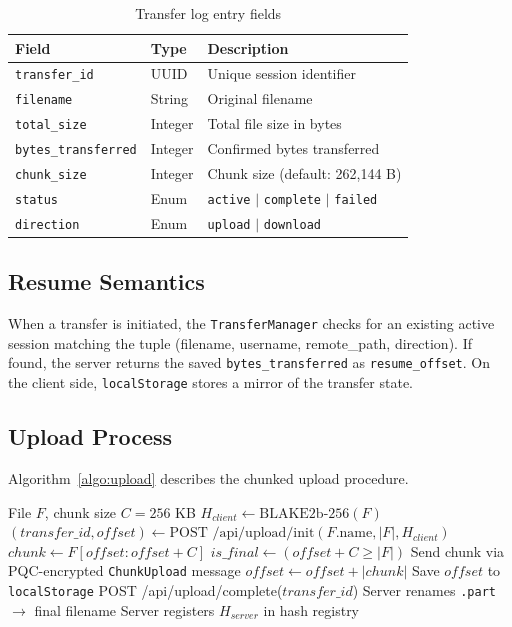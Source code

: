 \begin{table}[H]
    \centering
    \caption{Transfer log entry fields}
    \label{tab:transfer}
    \begin{tabular}{|l|l|p{7cm}|}
        \hline
        \textbf{Field} & \textbf{Type} & \textbf{Description} \\
        \hline
        \texttt{transfer\_id} & UUID & Unique session identifier \\
        \hline
        \texttt{filename} & String & Original filename \\
        \hline
        \texttt{total\_size} & Integer & Total file size in bytes \\
        \hline
        \texttt{bytes\_transferred} & Integer & Confirmed bytes transferred \\
        \hline
        \texttt{chunk\_size} & Integer & Chunk size (default: 262,144 B) \\
        \hline
        \texttt{status} & Enum & \texttt{active} $|$ \texttt{complete} $|$ \texttt{failed} \\
        \hline
        \texttt{direction} & Enum & \texttt{upload} $|$ \texttt{download} \\
        \hline
    \end{tabular}
\end{table}

\subsection{Resume Semantics}

When a transfer is initiated, the \texttt{TransferManager} checks for an existing active session matching the tuple (filename, username, remote\_path, direction). If found, the server returns the saved \texttt{bytes\_transferred} as \texttt{resume\_offset}. On the client side, \texttt{localStorage} stores a mirror of the transfer state.

\subsection{Upload Process}

Algorithm~\ref{algo:upload} describes the chunked upload procedure.

\begin{algorithm}[H]
\caption{Chunked Resumable Upload}
\label{algo:upload}
\begin{algorithmic}[1]
\Require File $F$, chunk size $C = 256$ KB
\State $H_{client} \gets \text{BLAKE2b-256}(F)$
\State $(transfer\_id, offset) \gets \text{POST /api/upload/init}(F.\text{name}, |F|, H_{client})$
    \State $chunk \gets F[offset : offset + C]$
    \State $is\_final \gets (offset + C \geq |F|)$
    \State Send chunk via PQC-encrypted \texttt{ChunkUpload} message
    \State $offset \gets offset + |chunk|$
    \State Save $offset$ to \texttt{localStorage}
\EndWhile
\State POST /api/upload/complete($transfer\_id$)
\State Server renames \texttt{.part} $\rightarrow$ final filename
\State Server registers $H_{server}$ in hash registry
\end{algorithmic}
\end{algorithm}

